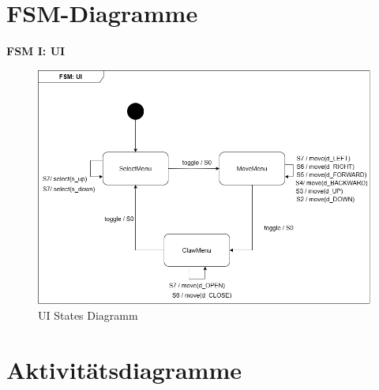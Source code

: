 \clearpage
\section{FSM-Diagramme}

\textbf{FSM I: UI}\\
\begin{figure}[h]  
    \centering
    \includegraphics[width=0.8\linewidth]{diagrams/FSM_UI.drawio.png}
    \caption{UI States Diagramm}
    \label{fig:UI_States_Diagramm}
\end{figure}

\clearpage 
\section{Aktivitätsdiagramme}









